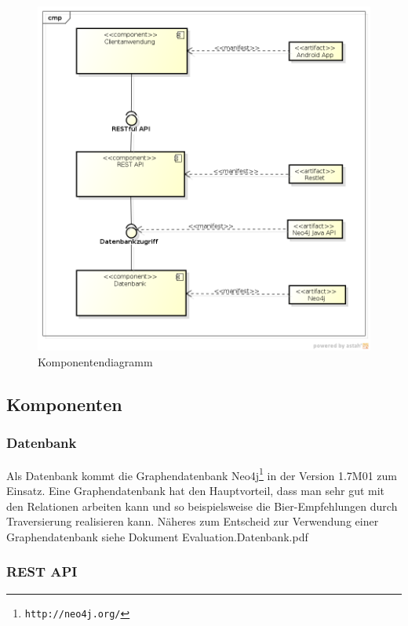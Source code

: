 \documentclass[10pt,a4paper]{scrartcl}
\begin{document}
\begin{figure}[H]
	\includegraphics[width=\textwidth]{ComponentDiagram.png}
	\caption{Komponentendiagramm}
	\label{fig:component_diagram}
\end{figure}


\subsection{Komponenten}

\subsubsection{Datenbank}

Als Datenbank kommt die Graphendatenbank Neo4j\footnote{\texttt{http://neo4j.org/}} in der Version 1.7M01 zum Einsatz.
Eine Graphendatenbank hat den Hauptvorteil, dass man sehr gut mit den Relationen arbeiten kann und
so beispielsweise die Bier-Empfehlungen durch Traversierung realisieren kann. Näheres zum Entscheid
zur Verwendung einer Graphendatenbank siehe Dokument Evaluation.Datenbank.pdf

\subsubsection{REST API}
\end{document}
